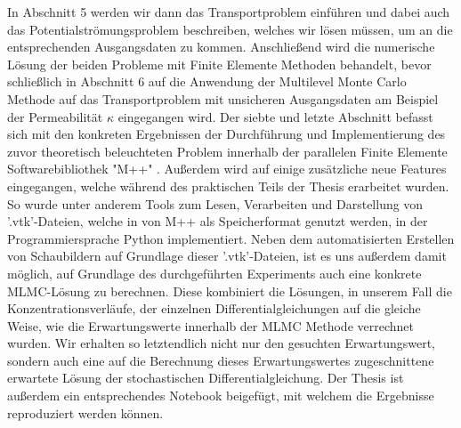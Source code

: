 In Abschnitt 5 werden wir dann das Transportproblem einführen und dabei auch das Potentialströmungsproblem beschreiben, welches wir lösen müssen, um an die entsprechenden Ausgangsdaten zu kommen. Anschließend wird die numerische Lösung der beiden Probleme mit Finite Elemente Methoden behandelt, bevor schließlich in Abschnitt 6 auf die Anwendung der Multilevel Monte Carlo Methode auf das Transportproblem mit unsicheren Ausgangsdaten am Beispiel der Permeabilität $\kappa$ eingegangen wird. 
Der siebte und letzte Abschnitt befasst sich mit den konkreten Ergebnissen der Durchführung und Implementierung des zuvor theoretisch beleuchteten Problem innerhalb der parallelen Finite Elemente Softwarebibliothek "M++" \cite{siteM++}. Außerdem wird auf einige zusätzliche neue Features eingegangen, welche während des praktischen Teils der Thesis erarbeitet wurden. So wurde unter anderem Tools zum Lesen, Verarbeiten und Darstellung von '.vtk'-Dateien, welche in von M++ als Speicherformat genutzt werden, in der Programmiersprache Python implementiert. Neben dem automatisierten Erstellen von Schaubildern auf Grundlage dieser '.vtk'-Dateien, ist es uns außerdem damit möglich, auf Grundlage des durchgeführten Experiments auch eine konkrete MLMC-Lösung zu berechnen. Diese kombiniert die Lösungen, in unserem Fall die Konzentrationsverläufe, der einzelnen Differentialgleichungen auf die gleiche Weise, wie die Erwartungswerte innerhalb der MLMC Methode verrechnet wurden. Wir erhalten so letztendlich nicht nur den gesuchten Erwartungswert, sondern auch eine auf die Berechnung dieses Erwartungswertes zugeschnittene erwartete Lösung der stochastischen Differentialgleichung. 
Der Thesis ist außerdem ein entsprechendes Notebook beigefügt, mit welchem die Ergebnisse reproduziert werden können.
